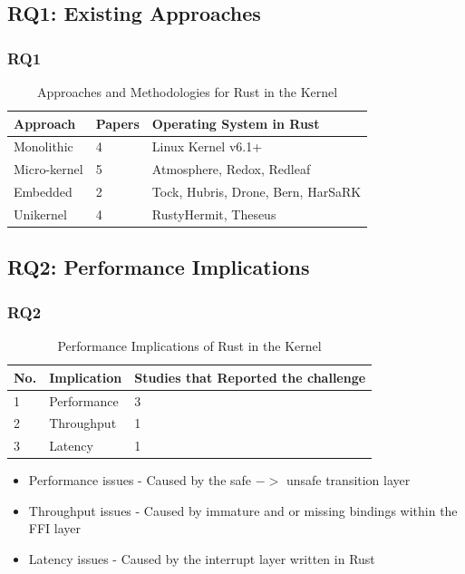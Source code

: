 \documentclass{beamer}
\begin{document}
\subsection{RQ1: Existing Approaches}
\begin{frame}
  \frametitle{RQ1}
  \begin{table}
    \caption{Approaches and Methodologies for Rust in the Kernel}
    \begin{tabular}{||l|l|l||}
      \hline
      Approach & Papers & Operating System in Rust\\
      \hline\hline
      Monolithic   & 4 & Linux Kernel v6.1+\\
      Micro-kernel & 5 & Atmosphere, Redox, Redleaf\\
      Embedded     & 2 & Tock, Hubris, Drone, Bern, HarSaRK \\
      Unikernel & 4 & RustyHermit, Theseus \\
       \hline
    \end{tabular}
    \label{tab:RQ1}
  \end{table}

\end{frame}

\subsection{RQ2: Performance Implications}
\begin{frame}
  \frametitle{RQ2}
  \begin{table}
    \caption{Performance Implications of Rust in the Kernel}
    \begin{tabular}{||l|l|l||}
      \hline
      No. & Implication & Studies that Reported the challenge\\
      \hline\hline
      1 & Performance & 3\\
      2 & Throughput & 1\\
      3 & Latency & 1 \\
      \hline
    \end{tabular}
    \label{tab:RQ2}
  \end{table}

  \begin{itemize}
  \item Performance issues - Caused by the safe $->$ unsafe transition layer
  \item Throughput issues - Caused by immature and or missing bindings within the FFI layer
  \item Latency issues - Caused by the interrupt layer written in Rust
  \end{itemize}

\end{frame}
\end{document}
